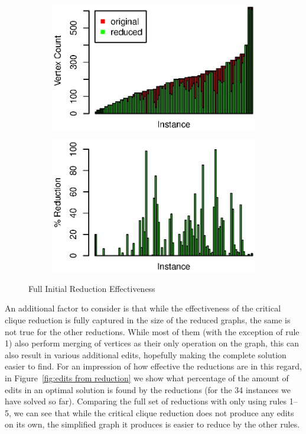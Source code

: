\documentclass[12pt,oneside,english,parskip=full,headings=small]{scrbook}
\theoremstyle{definition}
\begin{document}
\begin{figure}[h]
	\begin{subfigure}{0.49\textwidth}
		\includegraphics[width=1.0\linewidth]{full_initial_absolute}
	\end{subfigure}
	\begin{subfigure}{0.49\textwidth}
		\includegraphics[width=1.0\linewidth]{full_initial_percent}
	\end{subfigure}
	\caption{Full Initial Reduction Effectiveness}
	\label{fig:initial eff}
\end{figure}

An additional factor to consider is that while the effectiveness of the critical clique reduction is
fully captured in the size of the reduced graphs, the same is not true for the other reductions.
While most of them (with the exception of rule 1) also perform merging of vertices as their only
operation on the graph, this can also result in various additional edits, hopefully making the
complete solution easier to find. For an impression of how effective the reductions are in this
regard, in Figure~\ref{fig:edits from reduction} we show what percentage of the amount of edits in
an optimal solution is found by the reductions (for the 34 instances we have solved so far).
Comparing the full set of reductions with only using rules 1--5, we can see that while the critical
clique reduction does not produce any edits on its own, the simplified graph it produces is easier
to reduce by the other rules.
\end{document}
